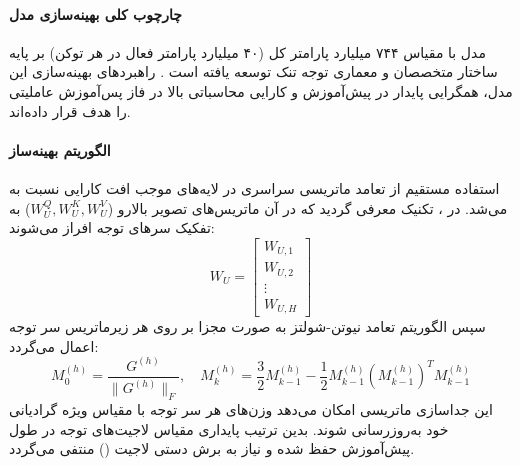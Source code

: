 \item {}

\paragraph*{چارچوب کلی بهینه‌سازی مدل }
مدل  با مقیاس ۷۴۴ میلیارد پارامتر کل (۴۰ میلیارد پارامتر فعال در هر توکن) بر پایه ساختار متخصصان  و معماری توجه تنک  توسعه یافته است \cite{zeng2026glm5}. راهبردهای بهینه‌سازی این مدل، همگرایی پایدار در پیش‌آموزش و کارایی محاسباتی بالا در فاز پس‌آموزش عاملیتی را هدف قرار داده‌اند.

\paragraph*{الگوریتم بهینه‌ساز }
استفاده مستقیم از تعامد ماتریسی سراسری در لایه‌های  موجب افت کارایی نسبت به  می‌شد. در ، تکنیک  معرفی گردید که در آن ماتریس‌های تصویر بالارو ($W_U^Q, W_U^K, W_U^V$) به تفکیک سرهای توجه افراز می‌شوند:
\begin{equation}
    W_U = \begin{bmatrix} W_{U, 1} \\ W_{U, 2} \\ \vdots \\ W_{U, H} \end{bmatrix}
\end{equation}
سپس الگوریتم تعامد نیوتن-شولتز به صورت مجزا بر روی هر زیرماتریس سر توجه اعمال می‌گردد:
\begin{equation}
    M_0^{(h)} = \frac{G^{(h)}}{\|G^{(h)}\|_F}, \quad M_{k}^{(h)} = \frac{3}{2} M_{k-1}^{(h)} - \frac{1}{2} M_{k-1}^{(h)} (M_{k-1}^{(h)})^T M_{k-1}^{(h)}
\end{equation}
این جداسازی ماتریسی امکان می‌دهد وزن‌های هر سر توجه با مقیاس ویژه گرادیانی خود به‌روزرسانی شوند. بدین ترتیب پایداری مقیاس لاجیت‌های توجه در طول پیش‌آموزش حفظ شده و نیاز به برش دستی لاجیت () منتفی می‌گردد.

